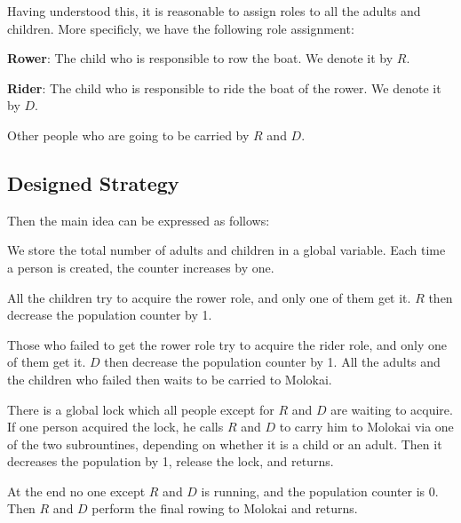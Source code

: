\documentclass{article}
\begin{document}
\begin{spacing}{1.1}
Having understood this, it is reasonable to assign roles to all the adults and children. More specificly, we have the following role assignment:
\begin{asparaitem}
  \item \textbf{Rower}: The child who is responsible to row the boat. We denote it by $R$.\\
  \item \textbf{Rider}: The child who is responsible to ride the boat of the rower. We denote it by $D$.\\
  \item Other people who are going to be carried by $R$ and $D$.\\
\end{asparaitem}

\subsection{Designed Strategy}
Then the main idea can be expressed as follows:
\begin{asparaitem}
  \item We store the total number of adults and children in a global variable. Each time a person is created, the counter increases by one.\\
  \item All the children try to acquire the rower role, and only one of them get it. $R$ then decrease the population counter by 1.\\
  \item Those who failed to get the rower role try to acquire the rider role, and only one of them get it. $D$ then decrease the population counter by 1. All the adults and the children who failed then waits to be carried to Molokai.\\
  \item There is a global lock which all people except for $R$ and $D$ are waiting to acquire. If one person acquired the lock, he calls $R$ and $D$ to carry him to Molokai via one of the two subrountines, depending on whether it is a child or an adult. Then it decreases the population by 1, release the lock, and returns.\\
  \item At the end no one except $R$ and $D$ is running, and the population counter is 0. Then $R$ and $D$ perform the final rowing to Molokai and returns.
\end{asparaitem}


\end{spacing}
\end{document}
